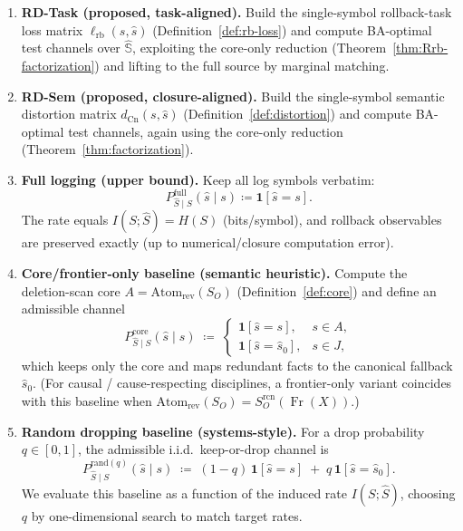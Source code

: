 \documentclass[twoside]{article}
\DeclareMathOperator{\Fr}{Fr}
\newcommand{\Cn}{\mathrm{Cn}}
\newcommand{\Atom}{\mathrm{Atom}}
\newcommand{\1}{\mathbf{1}}
\begin{document}
\begin{enumerate}[leftmargin=*, itemsep=2pt]
  \item \textbf{RD-Task (proposed, task-aligned).}
  Build the single-symbol rollback-task loss matrix \(\ell_{\mathrm{rb}}(s,\hat s)\)
  (Definition~\ref{def:rb-loss}) and compute BA-optimal test channels over \(\hat{\mathbb S}\),
  exploiting the core-only reduction (Theorem~\ref{thm:Rrb-factorization}) and lifting to the full
  source by marginal matching.

  \item \textbf{RD-Sem (proposed, closure-aligned).}
  Build the single-symbol semantic distortion matrix \(d_{\Cn}(s,\hat s)\)
  (Definition~\ref{def:distortion}) and compute BA-optimal test channels, again using the core-only
  reduction (Theorem~\ref{thm:factorization}).

  \item \textbf{Full logging (upper bound).}
  Keep all log symbols verbatim:
  \[
  P_{\hat S\mid S}^{\mathrm{full}}(\hat s\mid s)\coloneqq \mathbf{1}[\hat s=s].
  \]
  The rate equals \(I(S;\hat S)=H(S)\) (bits/symbol), and rollback observables are preserved exactly
  (up to numerical/closure computation error).

  \item \textbf{Core/frontier-only baseline (semantic heuristic).}
  Compute the deletion-scan core \(A=\Atom_{\mathrm{rev}}(S_O)\) (Definition~\ref{def:core}) and
  define an admissible channel
  \[
  P_{\hat S\mid S}^{\mathrm{core}}(\hat s\mid s)\;\coloneqq\;
  \begin{cases}
    \mathbf{1}[\hat s=s], & s\in A,\\[2pt]
    \mathbf{1}[\hat s=\hat s_0], & s\in J,
  \end{cases}
  \]
  which keeps only the core and maps redundant facts to the canonical fallback \(\hat s_0\).
  (For causal / cause-respecting disciplines, a frontier-only variant coincides with this baseline
  when \(\Atom_{\mathrm{rev}}(S_O)=S_O^{\mathrm{rcn}}(\Fr(X))\).)

  \item \textbf{Random dropping baseline (systems-style).}
  For a drop probability \(q\in[0,1]\), the admissible i.i.d.\ keep-or-drop channel is
  \[
  P_{\hat S\mid S}^{\mathrm{rand}(q)}(\hat s\mid s)\;\coloneqq\;
  (1-q)\,\mathbf{1}[\hat s=s]\;+\;q\,\mathbf{1}[\hat s=\hat s_0].
  \]
  We evaluate this baseline as a function of the induced rate \(I(S;\hat S)\), choosing \(q\) by
  one-dimensional search to match target rates.
\end{enumerate}
\end{document}
